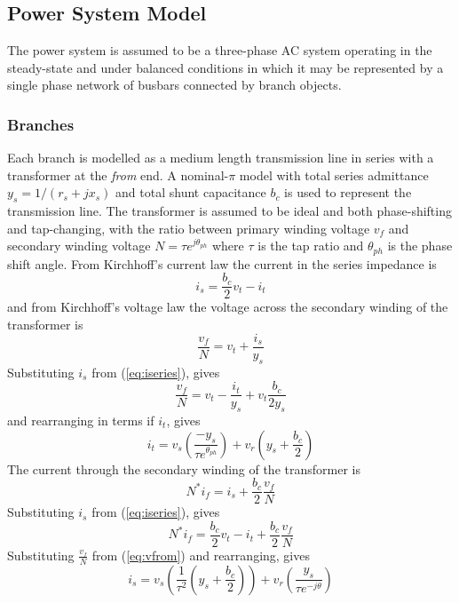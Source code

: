 \subsection{Power System Model}
The power system is assumed to be a three-phase AC system operating in the
steady-state and under balanced conditions in which it may be represented by a
single phase network of busbars connected by branch objects.

\subsubsection{Branches}
Each branch is modelled as a medium length transmission line in series with a
transformer at the \textit{from} end.  A nominal-$\pi$ model with total series
admittance $y_s = 1/(r_s+jx_s)$ and total shunt capacitance $b_c$ is
used to represent the transmission line.  The transformer is assumed to be
ideal and both phase-shifting and tap-changing, with the ratio between primary
winding voltage $v_{f}$ and secondary winding voltage $N = \tau
e^{j\theta_{ph}}$ where $\tau$ is the tap ratio and $\theta_{ph}$ is the phase
shift angle.  From Kirchhoff's current law the current in the series impedance
is
\begin{equation}
\label{eq:iseries}
i_s = \frac{b_c}{2}v_t - i_t
\end{equation}
and from Kirchhoff's voltage law the voltage across the secondary winding of
the transformer is
\begin{equation}
\frac{v_{f}}{N} = v_t + \frac{i_s}{y_s}
\end{equation}
Substituting $i_s$ from (\ref{eq:iseries}), gives
\begin{equation}
\label{eq:vfrom}
\frac{v_{f}}{N} = v_t - \frac{i_t}{y_s} + v_t\frac{b_c}{2y_s}
\end{equation}
and rearranging in terms if $i_t$, gives
\begin{equation}
\label{eq:ito}
i_t = v_s \left( \frac{-y_s}{\tau e^{\theta_{ph}}} \right) +
v_r \left( y_s + \frac{b_c}{2} \right)
\end{equation}
The current through the secondary winding of the transformer is
\begin{equation}
N^*i_f = i_s + \frac{b_c}{2}\frac{v_{f}}{N}
\end{equation}
Substituting $i_s$ from (\ref{eq:iseries}), gives
\begin{equation}
N^*i_f = \frac{b_c}{2}v_t - i_t + \frac{b_c}{2}\frac{v_{f}}{N}
\end{equation}
Substituting $\frac{v_{f}}{N}$ from (\ref{eq:vfrom}) and rearranging, gives
\begin{equation}
\label{eq:ifrom}
i_s = v_s \left( \frac{1}{\tau^2} \left(y_s + \frac{b_c}{2}\right) \right) +
v_r \left(\frac{y_s}{\tau e^{-j\theta}}\right)
\end{equation}

